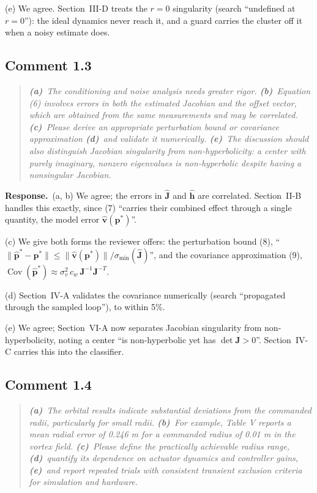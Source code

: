 \documentclass[10pt]{article}
\newcommand{\rev}[1]{#1}                             %
\newcommand{\resp}{\par\textbf{Response.}~}
\begin{document}
(e) We agree. Section~III-D treats the $r = 0$ singularity (search ``undefined at $r = 0$''): the ideal dynamics never reach it, and a guard carries the cluster off it when a noisy estimate does.

\subsection*{Comment 1.3}

\begin{quote}\itshape
\textbf{(a)}~The conditioning and noise analysis needs greater rigor.
\textbf{(b)}~Equation (6) involves errors in both the estimated Jacobian and the offset vector, which are obtained from the same measurements and may be correlated.
\textbf{(c)}~Please derive an appropriate perturbation bound or covariance approximation
\textbf{(d)}~and validate it numerically.
\textbf{(e)}~The discussion should also distinguish Jacobian singularity from non-hyperbolicity: a center with purely imaginary, nonzero eigenvalues is non-hyperbolic despite having a nonsingular Jacobian.
\end{quote}

\resp (a, b) We agree; the errors in $\hat{\mathbf{J}}$ and $\hat{\mathbf{h}}$ are correlated. Section~II-B handles this exactly, since (7) ``carries their combined effect through a single quantity, the model error $\hat{\mathbf{v}}(\mathbf{p}^*)$''.

(c) We give both forms the reviewer offers: the perturbation bound (8), ``$\|\hat{\mathbf{p}}^* - \mathbf{p}^*\| \le \|\hat{\mathbf{v}}(\mathbf{p}^*)\|/\sigma_{\min}(\hat{\mathbf{J}})$'', and the covariance approximation (9), $\operatorname{Cov}(\hat{\mathbf{p}}^*) \approx \sigma_v^2\, c_w\, \mathbf{J}^{-1}\mathbf{J}^{-T}$.

(d) Section~IV-A validates the covariance numerically (search ``propagated through the sampled loop''), to within \rev{5}\%.

(e) We agree; Section~VI-A now separates Jacobian singularity from non-hyperbolicity, noting a center ``is non-hyperbolic yet has $\det\mathbf{J} > 0$''. Section~IV-C carries this into the classifier.

\subsection*{Comment 1.4}

\begin{quote}\itshape
\textbf{(a)}~The orbital results indicate substantial deviations from the commanded radii, particularly for small radii.
\textbf{(b)}~For example, Table V reports a mean radial error of 0.246 m for a commanded radius of 0.01 m in the vortex field.
\textbf{(c)}~Please define the practically achievable radius range,
\textbf{(d)}~quantify its dependence on actuator dynamics and controller gains,
\textbf{(e)}~and report repeated trials with consistent transient exclusion criteria for simulation and hardware.
\end{quote}
\end{document}
